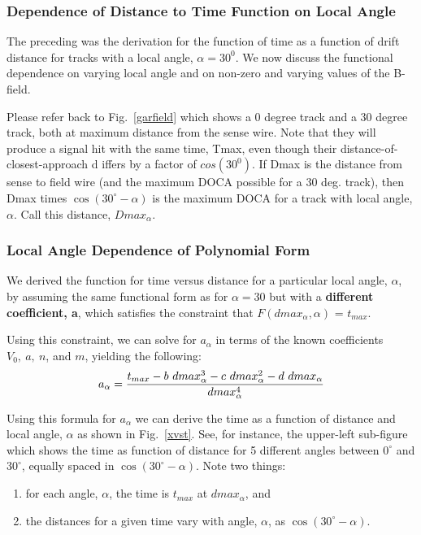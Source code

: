 \subsubsection{Dependence of Distance to Time Function on Local Angle}
\noindent
The preceding was the derivation for the function of time as a function
of drift distance for tracks with a local angle, $\alpha = 30^0$.  
We now discuss the
functional dependence on varying local angle and on non-zero and varying
values of the B-field.

Please refer back to Fig.~\ref{garfield} which shows a 0 degree track and a 30 degree
track, both at maximum distance from the sense wire.  Note that they will produce
a signal hit with the same time, Tmax, even though their distance-of-closest-approach d
iffers by a factor
of $cos(30^{0})$.  If Dmax is the distance from sense to field wire (and the maximum
DOCA possible for a 30 deg. track), then Dmax times $\cos(30^\circ-\alpha)$ is the maximum
DOCA for a track with local angle, $\alpha$.  Call this distance, $Dmax_{\alpha}$.

\subsubsection{Local Angle Dependence of Polynomial Form}
We derived the function for time versus distance for a particular local angle, $\alpha$, by
assuming the same functional form as for $\alpha = 30$ but with a {\bf different coefficient, a}, which 
satisfies the constraint that  $F(dmax_{\alpha},\alpha)$ = $t_{max}$.

Using this constraint, we can solve for $a_{\alpha}$ in terms of the known coefficients $V_0, ~a, ~n$, and $m$,
yielding the following:
\begin{equation}
\label{aalphaequation}
a_{\alpha} = {{t_{max} - b ~dmax_{\alpha}^3 - c ~dmax_{\alpha}^2 - d ~dmax_{\alpha}}\over{dmax_{\alpha}^4}}
\end{equation}

Using this formula for $a_{\alpha}$ we can derive the time as a function of distance and local
angle, $\alpha$ as shown in Fig.~\ref{xvst}.  See, for instance, the upper-left sub-figure 
which shows the time as function of distance for 5 different angles between $0^{\circ}$ and 
$30^{\circ}$, equally spaced in $\cos \left(30^\circ-\alpha\right)$.  Note two things:
\begin{enumerate}
\item for each angle, $\alpha$, the time is $t_{max}$ at $dmax_{\alpha}$, and
\item the distances for a given time vary with angle, $\alpha$, as $\cos \left(30^\circ-\alpha\right)$.
\end{enumerate}

